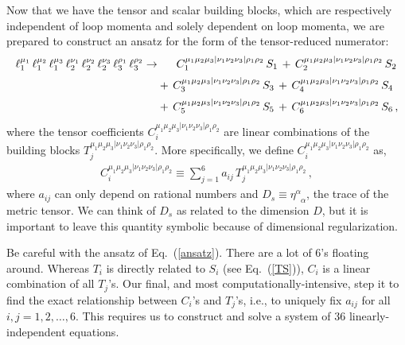 \documentclass[aps,prd,preprint,eqsecnum,tightenlines,nofootinbib,showpacs]{revtex4}
\def\eqn#1{Eq.~({\ref{#1}})}
\begin{document}
Now that we have the tensor and scalar building blocks, which are respectively independent of loop momenta and solely dependent on loop momenta, we are prepared to construct an ansatz for the form 
of the tensor-reduced numerator:
\begin{align}
\ell_{1}^{\mu_{1}}\, \ell_{1}^{\mu_{2}}\, \ell_{1}^{\mu_{3}}\,
\ell_{2}^{\nu_{1}}\, \ell_{2}^{\nu_{2}}\, \ell_{2}^{\nu_{3}}\,
\ell_{3}^{\rho_{1}}\, \ell_{3}^{\rho_{2}}
\rightarrow
&\hspace{.6cm}
C_{1}^{\mu_{1}\mu_{2}\mu_{3}|\nu_{1}\nu_{2}\nu_{3}|\rho_{1}\rho_{2}}\,
S_{1}
\,+\,
C_{2}^{\mu_{1}\mu_{2}\mu_{3}|\nu_{1}\nu_{2}\nu_{3}|\rho_{1}\rho_{2}}\,
S_{2}
\nonumber\\[.05cm]&
+\,
C_{3}^{\mu_{1}\mu_{2}\mu_{3}|\nu_{1}\nu_{2}\nu_{3}|\rho_{1}\rho_{2}}\,
S_{3}
\,+\,
C_{4}^{\mu_{1}\mu_{2}\mu_{3}|\nu_{1}\nu_{2}\nu_{3}|\rho_{1}\rho_{2}}\,
S_{4}
\nonumber\\[.05cm]&
+\,
C_{5}^{\mu_{1}\mu_{2}\mu_{3}|\nu_{1}\nu_{2}\nu_{3}|\rho_{1}\rho_{2}}\,
S_{5}
\,+\,
C_{6}^{\mu_{1}\mu_{2}\mu_{3}|\nu_{1}\nu_{2}\nu_{3}|\rho_{1}\rho_{2}}\,
S_{6}
\,,
\label{ansatz}
\end{align}
where the tensor coefficients $C_{i}^{\mu_{1}\mu_{2}\mu_{3}|\nu_{1}\nu_{2}\nu_{3}|\rho_{1}\rho_{2}}$
are linear combinations of the building blocks
$T_{j}^{\mu_{1}\mu_{2}\mu_{3}|\nu_{1}\nu_{2}\nu_{3}|\rho_{1}\rho_{2}}$.
More specifically, we define $C_{i}^{\mu_{1}\mu_{2}\mu_{3}|\nu_{1}\nu_{2}\nu_{3}|\rho_{1}\rho_{2}}$
as,
%
\begin{align}
C_{i}^{\mu_{1}\mu_{2}\mu_{3}|\nu_{1}\nu_{2}\nu_{3}|\rho_{1}\rho_{2}}
\equiv
\sum_{j=1}^{6}a_{ij}\,
T_{j}^{\mu_{1}\mu_{2}\mu_{3}|\nu_{1}\nu_{2}\nu_{3}|\rho_{1}\rho_{2}}\,,
\label{Cdef}
\end{align}
%
where $a_{ij}$ can only depend on rational numbers and $D_{s}\equiv \eta^{\alpha}_{\phantom{\alpha}\alpha}$, the trace of the metric tensor. We can think of $D_{s}$ as related to the dimension $D$,
but it is important to leave this quantity symbolic because of dimensional regularization.

Be careful with the ansatz of \eqn{ansatz}. There are a lot of 6's floating around. 
Whereas $T_{i}$ is directly related
to $S_{i}$ (see \eqn{TS}), $C_{i}$ is a linear combination of all $T_{j}$'s. Our final,
and most computationally-intensive, step it to find the exact relationship between $C_{i}$'s and
$T_{j}$'s, i.e., to uniquely fix $a_{ij}$ for all $i,j = 1,2,\ldots,6$. This requires us to construct
and solve a system of 36 linearly-independent equations.
\end{document}
